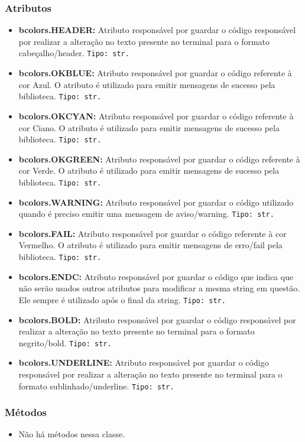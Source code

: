 \documentclass[10pt]{article}
\begin{document}
\begin{itemize}
        \subsubsection{\large Atributos}
            \begin{itemize}
            \item \textbf{bcolors.HEADER:} Atributo responsável por guardar o código responsável por realizar a alteração no texto presente no terminal para o formato cabeçalho/header. \texttt{Tipo: str.} 
            \item \textbf{bcolors.OKBLUE:} Atributo responsável por guardar o código referente à cor Azul. O atributo é utilizado para emitir mensagens de sucesso pela biblioteca. \texttt{Tipo: str.}
            \item \textbf{bcolors.OKCYAN:} Atributo responsável por guardar o código referente à cor Ciano. O atributo é utilizado para emitir mensagens de sucesso pela biblioteca. \texttt{Tipo: str.}
            \item \textbf{bcolors.OKGREEN:} Atributo responsável por guardar o código referente à cor Verde. O atributo é utilizado para emitir mensagens de sucesso pela biblioteca. \texttt{Tipo: str.}
            \item \textbf{bcolors.WARNING:} Atributo responsável por guardar o código utilizado quando é preciso emitir uma mensagem de aviso/warning. \texttt{Tipo: str.}
            \item \textbf{bcolors.FAIL:} Atributo responsável por guardar o código referente à cor Vermelho. O atributo é utilizado para emitir mensagens de erro/fail pela biblioteca. \texttt{Tipo: str.}
            \item \textbf{bcolors.ENDC:} Atributo responsável por guardar o código que indica que não serão usados outros atributos para modificar a mesma string em questão. Ele sempre é utilizado após o final da string. \texttt{Tipo: str.}
            \item \textbf{bcolors.BOLD:} Atributo responsável por guardar o código responsável por realizar a alteração no texto presente no terminal para o formato negrito/bold. \texttt{Tipo: str.} 
            \item \textbf{bcolors.UNDERLINE:} Atributo responsável por guardar o código responsável por realizar a alteração no texto presente no terminal para o formato sublinhado/underline. \texttt{Tipo: str.} 
            \end{itemize}
        \subsubsection{\large Métodos}
            \begin{itemize}
            \item Não há métodos nessa classe.
            \end{itemize}
        

\end{itemize}
\end{document}
